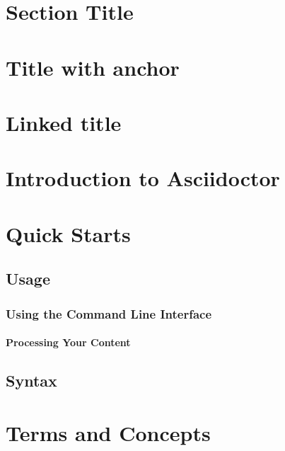 \hypertarget{_section_title}{\section*{Section Title}}

\hypertarget{_title_with_anchor}{\section*{Title with anchor}}

\hypertarget{_linked_title}{\section*{Linked title}}

\hypertarget{_introduction_to_asciidoctor}{\section{Introduction to Asciidoctor}}
\hypertarget{_quick_starts}{\section{Quick Starts}}
\hypertarget{_usage}{\subsection{Usage}}
\hypertarget{_using_the_command_line_interface}{\subsubsection{Using the Command Line Interface}}
\hypertarget{_processing_your_content}{\paragraph{Processing Your Content}}
\hypertarget{_syntax}{\subsection{Syntax}}
\hypertarget{_terms_and_concepts}{\section{Terms and Concepts}}

